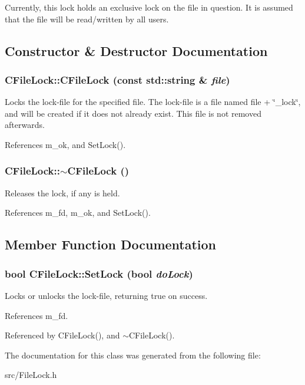 Currently, this lock holds an exclusive lock on the file in question. It is assumed that the file will be read/written by all users. 

\subsection{Constructor \& Destructor Documentation}
\subsubsection[{CFileLock}]{\setlength{\rightskip}{0pt plus 5cm}CFileLock::CFileLock (const std::string \& {\em file})\hspace{0.3cm}{\ttfamily  [inline]}}\label{classCFileLock_a1f7a780ef6ec99f44b661f4294b4aef3}


Locks the lock-\/file for the specified file. The lock-\/file is a file named file + \char`\"{}\_\-lock\char`\"{}, and will be created if it does not already exist. This file is not removed afterwards. 

References m\_\-ok, and SetLock().
\subsubsection[{$\sim$CFileLock}]{\setlength{\rightskip}{0pt plus 5cm}CFileLock::$\sim$CFileLock ()\hspace{0.3cm}{\ttfamily  [inline]}}\label{classCFileLock_a0c43b44f46ea40a7fe3df0be9799e6ac}


Releases the lock, if any is held. 

References m\_\-fd, m\_\-ok, and SetLock().

\subsection{Member Function Documentation}
\subsubsection[{SetLock}]{\setlength{\rightskip}{0pt plus 5cm}bool CFileLock::SetLock (bool {\em doLock})\hspace{0.3cm}{\ttfamily  [inline, private]}}\label{classCFileLock_ab66ba1186e9d7d6fde1312c7303af7ab}


Locks or unlocks the lock-\/file, returning true on success. 

References m\_\-fd.

Referenced by CFileLock(), and $\sim$CFileLock().

The documentation for this class was generated from the following file:\begin{DoxyCompactItemize}
\item 
src/FileLock.h\end{DoxyCompactItemize}
